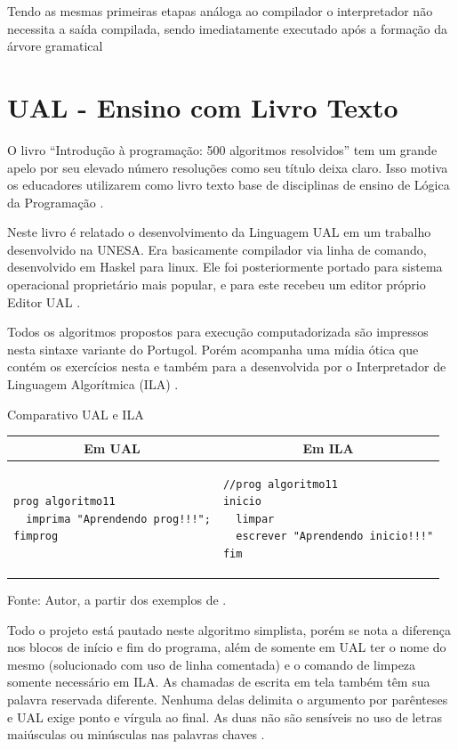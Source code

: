 Tendo as mesmas primeiras etapas análoga ao compilador o interpretador não necessita a saída compilada, sendo imediatamente executado após a formação da árvore gramatical \cite{citar}

\section{UAL - Ensino com Livro Texto}

O livro ``Introdução à programação: 500 algoritmos resolvidos'' tem um grande apelo por seu elevado número resoluções como seu título deixa claro. Isso motiva os educadores utilizarem como livro texto base de disciplinas de ensino de Lógica da Programação \cite{citar}.

Neste livro é relatado o desenvolvimento da Linguagem UAL em um trabalho desenvolvido na UNESA. Era basicamente compilador via linha de comando, desenvolvido em Haskel para linux. Ele foi posteriormente portado para sistema operacional proprietário mais popular, e para este recebeu um editor próprio Editor UAL \cite{citar}.

Todos os algoritmos propostos para execução computadorizada são impressos nesta sintaxe variante do Portugol. Porém acompanha uma mídia ótica que contém os exercícios nesta e também para a desenvolvida por  o Interpretador de Linguagem Algorítmica (ILA) \cite{citar}.

\begin{quadro}[h]
\centering
  \caption{Comparativo UAL e ILA}\label{qua:compare-ualila}
\begin{tabular}{| p{75mm} | p{75mm} |}\hline
\multicolumn{1}{|c|}{\textbf{Em UAL}} & \multicolumn{1}{|c|}{\textbf{Em ILA}} \\ \hline
\begin{lstlisting}[language=ual]
prog algoritmo11
  imprima "Aprendendo prog!!!";
fimprog
\end{lstlisting} &
\begin{lstlisting}[language=ila]
//prog algoritmo11
inicio
  limpar
  escrever "Aprendendo inicio!!!"
fim
\end{lstlisting} \\ \hline
\end{tabular}
  \caption*{\ifdraft{\color{green}}{}\footnotesize Fonte: Autor, a partir dos exemplos de .}
\end{quadro}

Todo o projeto está pautado neste algoritmo simplista, porém se nota a diferença nos blocos de início e fim do programa, além de somente em UAL ter o nome do mesmo (solucionado com uso de linha comentada) e o comando de limpeza somente necessário em ILA. As chamadas de escrita em tela também têm sua palavra reservada diferente. Nenhuma delas delimita o argumento por parênteses e UAL exige ponto e vírgula ao final. As duas não são sensíveis no uso de letras maiúsculas ou minúsculas nas palavras chaves \cite{citar}.

